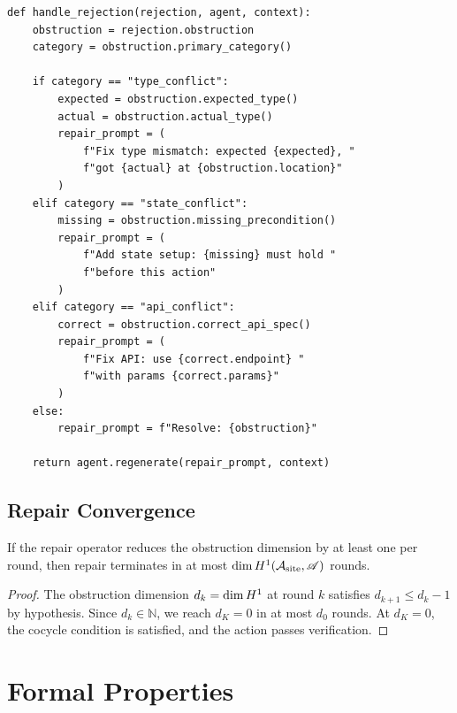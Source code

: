 \documentclass[11pt]{article}
\newcommand{\ActionSite}{\mathcal{A}_{\mathrm{site}}}
\newcommand{\ActionSheaf}{\mathscr{A}}
\begin{document}
\begin{lstlisting}[style=jugeo-python,caption={Obstruction-guided repair.}]
def handle_rejection(rejection, agent, context):
    obstruction = rejection.obstruction
    category = obstruction.primary_category()

    if category == "type_conflict":
        expected = obstruction.expected_type()
        actual = obstruction.actual_type()
        repair_prompt = (
            f"Fix type mismatch: expected {expected}, "
            f"got {actual} at {obstruction.location}"
        )
    elif category == "state_conflict":
        missing = obstruction.missing_precondition()
        repair_prompt = (
            f"Add state setup: {missing} must hold "
            f"before this action"
        )
    elif category == "api_conflict":
        correct = obstruction.correct_api_spec()
        repair_prompt = (
            f"Fix API: use {correct.endpoint} "
            f"with params {correct.params}"
        )
    else:
        repair_prompt = f"Resolve: {obstruction}"

    return agent.regenerate(repair_prompt, context)
\end{lstlisting}

\subsection{Repair Convergence}\label{subsec:repair-converge}

\begin{theorem}\label{thm:repair-converge}
If the repair operator reduces the obstruction dimension by at least
one per round, then repair terminates in at most
$\dim \Hcoh{1}(\ActionSite, \ActionSheaf)$ rounds.
\end{theorem}

\begin{proof}
The obstruction dimension $d_k = \dim H^{1}$ at round $k$ satisfies
$d_{k+1} \leq d_k - 1$ by hypothesis.  Since $d_k \in \mathbb{N}$,
we reach $d_K = 0$ in at most $d_0$ rounds.  At $d_K = 0$, the
cocycle condition is satisfied, and the action passes verification.
\end{proof}


\section{Formal Properties}\label{sec:formal-props}
\end{document}
